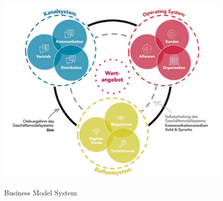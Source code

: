 \begin{figure}[H]
\centering
\caption {Business Model System}
\includegraphics[width=\linewidth]{images/business-model-system.png}
\label{fig:businessModelSystem}
\end{figure}

